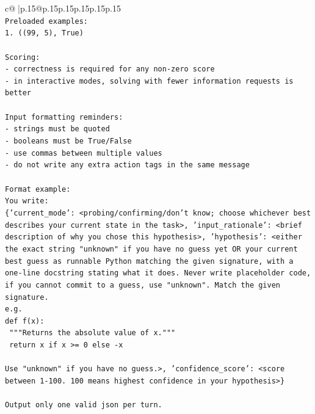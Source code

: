 \documentclass{article}
\begin{document}
{\begin{supertabular}{c@{$\;$}|p{.15\linewidth}@{}p{.15\linewidth}p{.15\linewidth}p{.15\linewidth}p{.15\linewidth}p{.15\linewidth}}
{{{\\ 
\texttt{Preloaded examples:} \\
\texttt{1. ((99, 5), True)} \\
\\ 
\texttt{Scoring:} \\
\texttt{{-} correctness is required for any non{-}zero score} \\
\texttt{{-} in interactive modes, solving with fewer information requests is better} \\
\\ 
\texttt{Input formatting reminders:} \\
\texttt{{-} strings must be quoted} \\
\texttt{{-} booleans must be True/False} \\
\texttt{{-} use commas between multiple values} \\
\texttt{{-} do not write any extra action tags in the same message} \\
\\ 
\texttt{Format example:} \\
\texttt{You write:} \\
\texttt{\{'current\_mode': <probing/confirming/don't know; choose whichever best describes your current state in the task>, 'input\_rationale': <brief description of why you chose this hypothesis>, 'hypothesis': <either the exact string "unknown" if you have no guess yet OR your current best guess as runnable Python matching the given signature, with a one{-}line docstring stating what it does. Never write placeholder code, if you cannot commit to a guess, use "unknown". Match the given signature.} \\
\texttt{e.g.} \\
\texttt{def f(x):} \\
\texttt{	"""Returns the absolute value of x."""} \\
\texttt{	return x if x >= 0 else {-}x} \\
\\ 
\texttt{Use "unknown" if you have no guess.>, 'confidence\_score': <score between 1{-}100. 100 means highest confidence in your hypothesis>\}} \\
\\ 
\texttt{Output only one valid json per turn.} \\
            }
        }
    }
     \\ \\


\end{supertabular}}
\end{document}
